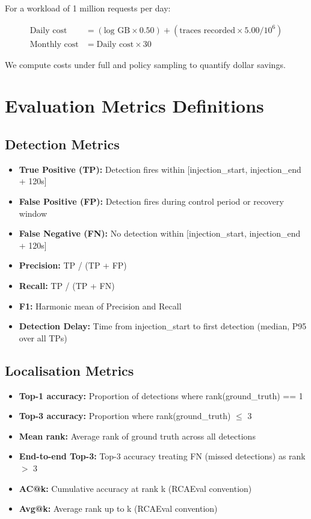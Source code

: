 For a workload of 1 million requests per day:

\begin{align*}
\text{Daily cost} &= (\text{log GB} \times 0.50) + (\text{traces recorded} \times 5.00 / 10^6) \\
\text{Monthly cost} &= \text{Daily cost} \times 30
\end{align*}

We compute costs under full and policy sampling to quantify dollar savings.

\section{Evaluation Metrics Definitions}

\subsection{Detection Metrics}

\begin{itemize}
    \item \textbf{True Positive (TP):} Detection fires within [injection\_start, injection\_end + 120s]
    \item \textbf{False Positive (FP):} Detection fires during control period or recovery window
    \item \textbf{False Negative (FN):} No detection within [injection\_start, injection\_end + 120s]
    \item \textbf{Precision:} TP / (TP + FP)
    \item \textbf{Recall:} TP / (TP + FN)
    \item \textbf{F1:} Harmonic mean of Precision and Recall
    \item \textbf{Detection Delay:} Time from injection\_start to first detection (median, P95 over all TPs)
\end{itemize}

\subsection{Localisation Metrics}

\begin{itemize}
    \item \textbf{Top-1 accuracy:} Proportion of detections where rank(ground\_truth) == 1
    \item \textbf{Top-3 accuracy:} Proportion where rank(ground\_truth) $\leq$ 3
    \item \textbf{Mean rank:} Average rank of ground truth across all detections
    \item \textbf{End-to-end Top-3:} Top-3 accuracy treating FN (missed detections) as rank $>$ 3
    \item \textbf{AC@k:} Cumulative accuracy at rank k (RCAEval convention)
    \item \textbf{Avg@k:} Average rank up to k (RCAEval convention)
\end{itemize}

